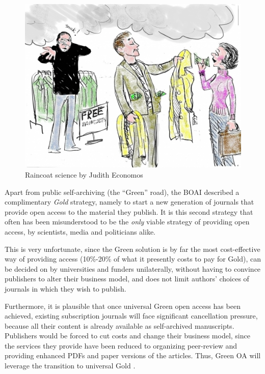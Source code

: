 \documentclass[11pt, openany, oneside, article, a4paper, twocolumn]{memoir}
\begin{document}
\begin{figure}
  \includegraphics[width=\columnwidth]{rain4.jpg}
  \caption{Raincoat science by Judith Economos}\label{fig:raincoat_science}
\end{figure}

Apart from public self-archiving (the \enquote{Green} road), the BOAI
described a complimentary \emph{Gold} strategy, namely to start a new
generation of journals that provide open access to the material they
publish. It is this second strategy that often has been misunderstood to
be the \emph{only} viable strategy of providing open access, by
scientists, media and politicians alike.

This is very unfortunate, since the Green solution is by far the most
cost-effective way of providing access \cite{houghton2013planting}
(10\%-20\% of what it presently costs to pay for Gold), can be decided on
by universities and funders unilaterally, without having to convince
publishers to alter their business model, and does not limit authors'
choices of journals in which they wish to publish.

Furthermore, it is plausible that once universal Green open access has been
achieved, existing subscription journals will face significant cancellation
pressure, because all their content is already available as self-archived
manuscripts. Publishers would be forced to cut costs and change their
business model, since the services they provide have been reduced to organizing
peer-review and providing enhanced PDFs and paper versions of the articles.
Thus, Green OA will leverage the transition to universal Gold
\cite{harnad2007green_road}.
\end{document}
